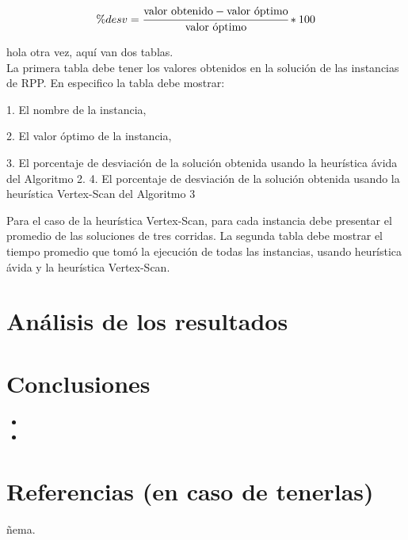\documentclass[11pt]{article}
\begin{document}
\begin{equation}
    \%desv = \cfrac{\text{valor obtenido} - \text{valor óptimo}}{\text{valor óptimo}} *100
\end{equation}

hola otra vez, aquí van dos tablas. \\

La primera tabla debe tener los valores obtenidos en la solución de las instancias de
RPP. En especifico la tabla debe mostrar:

1. El nombre de la instancia,

2. El valor óptimo de la instancia,

3. El porcentaje de desviación de la solución obtenida usando la heurística ávida del
Algoritmo 2.
4. El porcentaje de desviación de la solución obtenida usando la heurística Vertex-Scan
del Algoritmo 3

Para el caso de la heurística Vertex-Scan, para cada instancia debe presentar el promedio
de las soluciones de tres corridas.
La segunda tabla debe mostrar el tiempo promedio que tomó la ejecución de todas las
instancias, usando heurística ávida y la heurística Vertex-Scan.
\section{Análisis de los resultados}


\section{Conclusiones}

\begin{itemize}
   \item 
   \item 
\end{itemize}

\section{Referencias (en caso de tenerlas)}

ñema. \\
\end{document}
